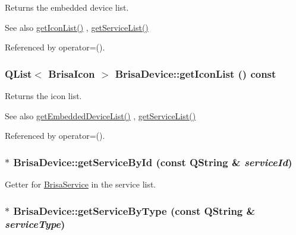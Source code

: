 Returns the embedded device list. \begin{DoxySeeAlso}{See also}
\hyperlink{classBrisaUpnp_1_1BrisaDevice_a7263a7b99c2a4972d4a728f32ddd6e7d}{getIconList()} , \hyperlink{classBrisaUpnp_1_1BrisaDevice_aa1b0d798eaca84dd4edfdc9c0a8957c4}{getServiceList()} 
\end{DoxySeeAlso}


Referenced by operator=().\hypertarget{classBrisaUpnp_1_1BrisaDevice_a7263a7b99c2a4972d4a728f32ddd6e7d}{
\subsubsection[{getIconList}]{\setlength{\rightskip}{0pt plus 5cm}QList$<$ {\bf BrisaIcon} $>$ BrisaDevice::getIconList () const}}
\label{classBrisaUpnp_1_1BrisaDevice_a7263a7b99c2a4972d4a728f32ddd6e7d}


Returns the icon list. \begin{DoxySeeAlso}{See also}
\hyperlink{classBrisaUpnp_1_1BrisaDevice_aca3708629a0be61fd39d551213557a71}{getEmbeddedDeviceList()} , \hyperlink{classBrisaUpnp_1_1BrisaDevice_aa1b0d798eaca84dd4edfdc9c0a8957c4}{getServiceList()} 
\end{DoxySeeAlso}


Referenced by operator=().\hypertarget{classBrisaUpnp_1_1BrisaDevice_ac2684a19b15247b37c26854e54a18180}{
\subsubsection[{getServiceById}]{ $\ast$ BrisaDevice::getServiceById (const QString \& {\em serviceId})}}
\label{classBrisaUpnp_1_1BrisaDevice_ac2684a19b15247b37c26854e54a18180}


Getter for \hyperlink{classBrisaUpnp_1_1BrisaService}{BrisaService} in the service list. \hypertarget{classBrisaUpnp_1_1BrisaDevice_a903a02e54f15ecdf85aa39235379855e}{
\subsubsection[{getServiceByType}]{ $\ast$ BrisaDevice::getServiceByType (const QString \& {\em serviceType})}}
\label{classBrisaUpnp_1_1BrisaDevice_a903a02e54f15ecdf85aa39235379855e}


